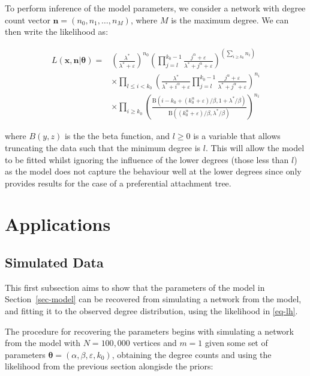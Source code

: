\documentclass[
  sn-basic,
]{sn-jnl}
\theoremstyle{plain}
\theoremstyle{plain}
\theoremstyle{remark}
\begin{document}
\newpage

To perform inference of the model parameters, we consider a network with
degree count vector \(\pmb n = (n_0, n_1, \ldots, n_M)\), where \(M\) is
the maximum degree. We can then write the likelihood as:

\begin{align*}
L(\pmb x,\pmb n | \pmb \theta) = &\left(\frac{\lambda^*}{\lambda^*+\varepsilon}\right)^{n_0}\left(\prod_{j=l}^{k_0-1}\frac{j^\alpha +\varepsilon}{\lambda^* + j^\alpha +\varepsilon}\right)^{\left(\sum_{i\ge k_0}n_{i}\right)} \\ &\times \prod_{l \le i<k_0}\left(\frac{\lambda^*}{\lambda^* +i^\alpha + \varepsilon } \prod_{j=l}^{k_0-1}\frac{j^\alpha + \varepsilon}{\lambda^* + j^\alpha + \varepsilon}\right)^{n_i}\\ &\times \prod_{i\ge k_0}\left(\frac{\text{B}(i-k_0 + (k_0^\alpha + \varepsilon)/\beta,1+\lambda^*/\beta)}{\text{B}((k_0^\alpha + \varepsilon)/\beta,\lambda^*/\beta)}\right)^{n_i}
\end{align*}\label{eq-lh}

where \(B(y,z)\) is the the beta function, and \(l\ge0\) is a variable
that allows truncating the data such that the minimum degree is \(l\).
This will allow the model to be fitted whilst ignoring the influence of
the lower degrees (those less than \(l\)) as the model does not capture
the behaviour well at the lower degrees since \citet{rudas07} only
provides results for the case of a preferential attachment tree.

\section{Applications}\label{applications}

\subsection{Simulated Data}\label{sec-sim}

This first subsection aims to show that the parameters of the model in
Section~\ref{sec-model} can be recovered from simulating a network from
the model, and fitting it to the observed degree distribution, using the
likelihood in \eqref{eq-lh}.

The procedure for recovering the parameters begins with simulating a
network from the model with \(N=100,000\) vertices and \(m=1\) given
some set of parameters
\(\pmb\theta = (\alpha, \beta, \varepsilon, k_0)\), obtaining the degree
counts and using the likelihood from the previous section alongisde the
priors:
\end{document}
